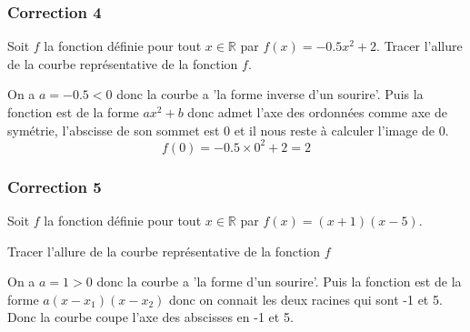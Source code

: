 \documentclass[15pt, mathserif]{beamer}
\newcommand{\R}{\mathbb{R}}			%
\begin{document}
\begin{frame}
\vspace{-10mm}
	\frametitle{Correction 4}
\vspace*{1cm} 
 Soit $f$ la fonction définie pour tout $x \in \R$ par $f(x)=-0.5x^2 +2$. Tracer l'allure de la courbe représentative de la fonction $f$. 
 
 \begin{multicols}{2} 
 On a $a=-0.5<0$ donc la courbe a 'la forme inverse d'un sourire'. Puis la fonction est de la forme $ax^2+b$ donc admet l'axe des ordonnées comme axe de symétrie, l'abscisse de son sommet est 0 et il nous reste à calculer l'image de 0. $$f(0)= -0.5\times 0^2+2=2$$ 
 
  \columnbreak  
 
 \end{multicols} 
 \end{frame}


\begin{frame}
\vspace{-10mm}
	\frametitle{Correction 5}
 \vspace*{1cm} Soit $f$ la fonction définie pour tout $x \in \R$ par $f(x)=(x+1)(x-5)$. 
 
  Tracer l'allure de la courbe représentative de la fonction $f$ 
 
 \begin{multicols}{2} 
 On a $a=1>0$ donc la courbe a 'la forme d'un sourire'. Puis la fonction est de la forme $a(x-x_1)(x-x_2)$ donc on connait les deux racines qui sont -1 et 5. Donc la courbe coupe l'axe des abscisses en -1 et 5. 
 
  \columnbreak  
 
 \end{multicols} 
 \end{frame}
\end{document}
